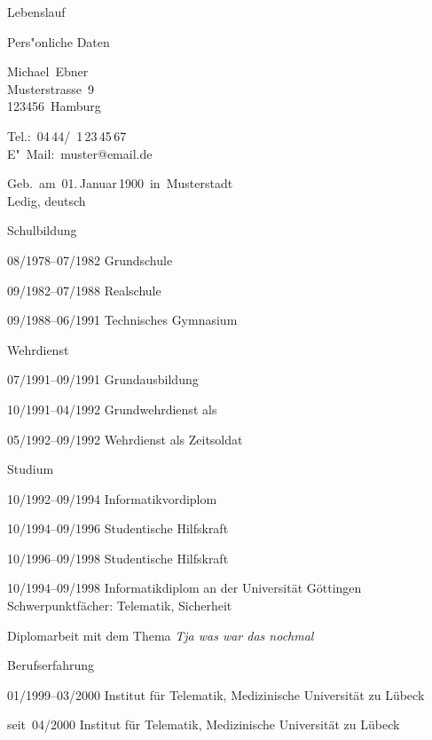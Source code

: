 \documentclass[11pt,a4paper]{scrartcl}
\begin{document}
\begin{cv}{Lebenslauf}
  \begin{cvlist}{Pers"onliche Daten}
  \item Michael~Ebner\\
    Musterstrasse~9\\
    123456~Hamburg
  \item Tel.:~04\,44/~1\,23\,45\,67\\
    E"~Mail:~muster@email.de
  \item Geb.~am~01.\,Januar\,1900~in~Musterstadt\\
    Ledig, deutsch
  \end{cvlist}
  \begin{cvlist}{Schulbildung}
  \item[08/1978--07/1982] Grundschule 
  \item[09/1982--07/1988] Realschule 
  \item[09/1988--06/1991] Technisches Gymnasium 
  \end{cvlist}


  \begin{cvlist}{Wehrdienst}
  \item[07/1991--09/1991] Grundausbildung 
  \item[10/1991--04/1992] Grundwehrdienst als 
  \item[05/1992--09/1992] Wehrdienst als Zeitsoldat
  \end{cvlist}

  \begin{cvlist}{Studium}
  \item[10/1992--09/1994] Informatikvordiplom 
                        
  \item[10/1994--09/1996] Studentische Hilfskraft 
  \item[10/1996--09/1998] Studentische Hilfskraft
  \item[10/1994--09/1998] Informatikdiplom an der Universität Göttingen\\
    Schwerpunktfächer: Telematik, Sicherheit
    
    Diplomarbeit mit dem Thema \emph{Tja was war das nochmal}

  \end{cvlist}


  \begin{cvlist}{Berufserfahrung}
  \item[01/1999--03/2000]  Institut für Telematik,
    Medizinische Universität zu Lübeck
  \item[seit~04/2000] Institut für Telematik, Medizinische Universität zu
    Lübeck
  \end{cvlist}


\end{cv}
\end{document}
